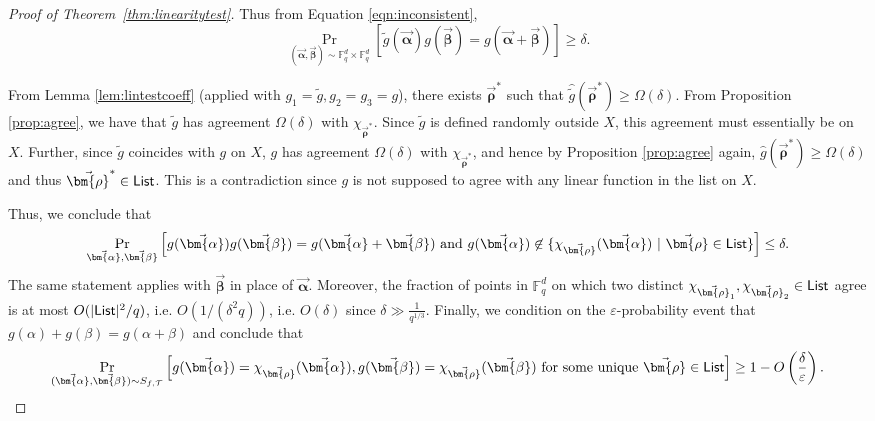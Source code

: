 \documentclass[10pt,a4paper]{article}
\newcommand{\F}{\mathbb{F}}
\renewcommand{\epsilon}{\varepsilon}
\newcommand{\alphab}{\vec{\bm{\alpha}}}
\newcommand{\betab}{\vec{\bm{\beta}}}
\renewcommand{\tilde}{\widetilde}
\newcommand{\rhob}{\vec{\bm{\rho}}}
\begin{document}
\begin{proof}[Proof of Theorem~\ref{thm:linearitytest}]
Thus from Equation \eqref{eqn:inconsistent}, 
$$\Pr_{(\alphab,\betab)\sim \F_q^d\times\F_q^d}[\tilde{g}(\alphab)g(\betab)=g(\alphab+\betab)] \geq \delta.$$

From Lemma \ref{lem:lintestcoeff} (applied with $g_1 = \tilde{g}, g_2=g_3=g$), 
there exists $\rhob^*$ such that $\hat{\tilde{g}}(\rhob^*) \geq \Omega(\delta)$. From 
Proposition \ref{prop:agree}, we have that $\tilde{g}$ has agreement $\Omega(\delta)$ with $\chi_{\rhob^*}$. Since $\tilde{g}$ is defined randomly
outside $X$, this agreement must essentially be on $X$. Further, since  $\tilde{g}$ coincides with $g$ on $X$, $g$ has agreement  $\Omega(\delta)$ 
with $\chi_{\rhob^*}$, and 
hence  by Proposition \ref{prop:agree} again, 
 $\hat{g}(\rhob^*) \geq \Omega(\delta)$ and thus $\rhob^* \in {\sf List}$. This is a contradiction since
$g$ is not supposed to agree with any linear function in the list on $X$.

Thus, we conclude that  
$$\Pr_{\alphab,\betab } \left[ g(\alphab) g(\betab)= g(\alphab+\betab) \ \mbox{and} \ g(\alphab) \not\in \{ \chi_{\rhob}(\alphab) ~| ~
\rhob \in {\sf List} \}
%
\right] \leq \delta.$$
The same statement applies with $\betab$ in place of $\alphab$. Moreover, the fraction of points in $\F_q^d$ on which two distinct 
$\chi_{\rhob_1}, \chi_{\rhob_2} \in {\sf List}$ agree is at most $O(|{\sf List}|^2/q)$, i.e. $O(1/(\delta^2q))$, i.e.
$O(\delta)$ since $\delta \gg \frac{1}{q^{1/3}}$. Finally, 
we condition on the $\epsilon$-probability event that $g(\alpha)+g(\beta)=g(\alpha+\beta)$ and 
conclude that 
$$\Pr_{(\alphab,\betab) \sim S_{f, {\mathcal T} }}  
\left[  g(\alphab) = \chi_{\rhob}(\alphab), 
g(\betab) = \chi_{\rhob}(\betab) \ \mbox{for some unique} \ \rhob \in {\sf List}  
%
\right] \geq 1- O\left(\frac{\delta}{\epsilon}\right).$$
\end{proof}
\end{document}
